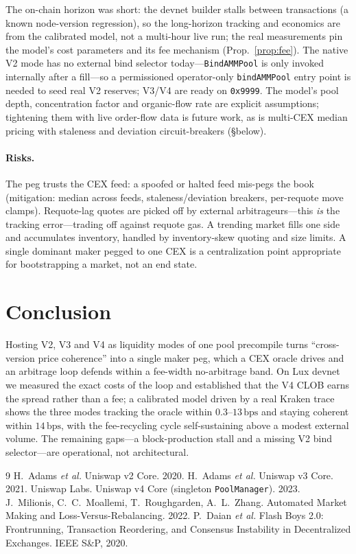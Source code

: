 \documentclass[11pt,a4paper]{article}
\newcommand{\bps}{\,\text{bps}}
\begin{document}
The on-chain horizon was short: the devnet builder stalls between transactions (a known
node-version regression), so the long-horizon tracking and economics are from the
calibrated model, not a multi-hour live run; the real measurements pin the model's cost
parameters and its fee mechanism (Prop.~\ref{prop:fee}). The native V2 mode has no
external bind selector today---\texttt{BindAMMPool} is only invoked internally after a
fill---so a permissioned operator-only \texttt{bindAMMPool} entry point is needed to seed
real V2 reserves; V3/V4 are ready on \texttt{0x9999}. The model's pool depth,
concentration factor and organic-flow rate are explicit assumptions; tightening them with
live order-flow data is future work, as is multi-CEX median pricing with staleness and
deviation circuit-breakers (\S below).

\paragraph{Risks.} The peg trusts the CEX feed: a spoofed or halted feed mis-pegs the
book (mitigation: median across feeds, staleness/deviation breakers, per-requote move
clamps). Requote-lag quotes are picked off by external arbitrageurs---this \emph{is} the
tracking error---trading off against requote gas. A trending market fills one side and
accumulates inventory, handled by inventory-skew quoting and size limits. A single
dominant maker pegged to one CEX is a centralization point appropriate for bootstrapping
a market, not an end state.

\section{Conclusion}

Hosting V2, V3 and V4 as liquidity modes of one pool precompile turns ``cross-version
price coherence'' into a single maker peg, which a CEX oracle drives and an arbitrage
loop defends within a fee-width no-arbitrage band. On Lux devnet we measured the exact
costs of the loop and established that the V4 CLOB earns the spread rather than a fee; a
calibrated model driven by a real Kraken trace shows the three modes tracking the oracle
within $0.3$--$13\bps$ and staying coherent within $14\bps$, with the fee-recycling cycle
self-sustaining above a modest external volume. The remaining gaps---a block-production
stall and a missing V2 bind selector---are operational, not architectural.

\begin{thebibliography}{9}
 H.~Adams \emph{et al.} Uniswap v2 Core. 2020.
 H.~Adams \emph{et al.} Uniswap v3 Core. 2021.
 Uniswap Labs. Uniswap v4 Core (singleton \texttt{PoolManager}). 2023.
 J.~Milionis, C.~C.~Moallemi, T.~Roughgarden, A.~L.~Zhang.
  Automated Market Making and Loss-Versus-Rebalancing. 2022.
 P.~Daian \emph{et al.} Flash Boys 2.0: Frontrunning, Transaction
  Reordering, and Consensus Instability in Decentralized Exchanges. IEEE S\&P, 2020.
\end{thebibliography}
\end{document}
